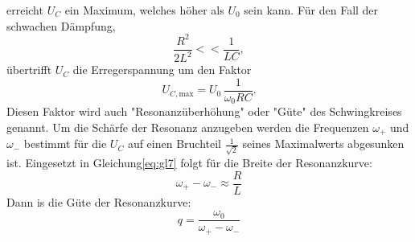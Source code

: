 erreicht $U_C$ ein Maximum, welches höher als $U_0$ sein kann.
Für den Fall der schwachen Dämpfung,
\begin{equation}
  \frac{R^2}{2L^2}<<\frac{1}{LC} ,
\end{equation}
übertrifft $U_C$ die Erregerspannung um den Faktor 
\begin{equation}
    U_{C,\text{max}} = U_0 \, \frac{1}{\omega_0 R C}.
    \label{eqn:umax}
\end{equation}
Diesen Faktor wird auch "Resonanzüberhöhung" oder "Güte" des Schwingkreises genannt.
Um die Schärfe der Resonanz anzugeben werden die Frequenzen $\omega_+$ und $\omega_-$ bestimmt für die $U_C$ auf einen Bruchteil $\frac{1}{\sqrt{2}}$ seines Maximalwerts abgesunken ist.
Eingesetzt in Gleichung\eqref{eq:gl7} folgt für die Breite der Resonanzkurve:
\begin{equation}
  \omega_+ - \omega_- \approx \frac{R}{L}
    \label{eqn:breite}
\end{equation}
Dann is die Güte der Resonanzkurve:
\begin{equation}
  q = \frac{\omega_0}{\omega_+ - \omega_-}
\end{equation}
